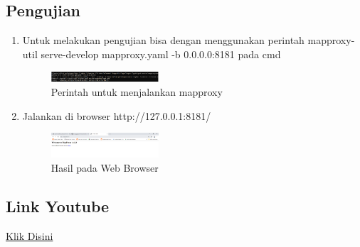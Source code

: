 \subsection{Pengujian}
\begin{enumerate}
    \item Untuk melakukan pengujian bisa dengan menggunakan perintah mapproxy-util serve-develop mapproxy.yaml -b 0.0.0.0:8181 pada cmd
    \hfill\break
    \begin{figure}[H]
		\includegraphics[width=4cm]{figures/1174039/tugas5/6.png}
		\centering
		\caption{Perintah untuk menjalankan mapproxy}
    \end{figure}
    \item Jalankan di browser http://127.0.0.1:8181/
    \hfill\break
    \begin{figure}[H]
		\includegraphics[width=4cm]{figures/1174039/tugas5/7.png}
		\centering
		\caption{Hasil pada Web Browser}
    \end{figure}
\end{enumerate}

\subsection{Link Youtube}
\href{https://youtu.be/n60By-QCgRU}{Klik Disini}